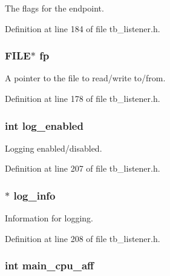 The flags for the endpoint. 



Definition at line 184 of file tb\-\_\-listener.\-h.

\hypertarget{structtb__listener__t_aa065f30aa9f5f9a42132c82c787ee70b}{
\subsubsection[{fp}]{\setlength{\rightskip}{0pt plus 5cm}F\-I\-L\-E$\ast$ fp}}\label{structtb__listener__t_aa065f30aa9f5f9a42132c82c787ee70b}


A pointer to the file to read/write to/from. 



Definition at line 178 of file tb\-\_\-listener.\-h.

\hypertarget{structtb__listener__t_a511e73c6f56fe64b24f9261939aec65f}{
\subsubsection[{log\-\_\-enabled}]{\setlength{\rightskip}{0pt plus 5cm}int log\-\_\-enabled}}\label{structtb__listener__t_a511e73c6f56fe64b24f9261939aec65f}


Logging enabled/disabled. 



Definition at line 207 of file tb\-\_\-listener.\-h.

\hypertarget{structtb__listener__t_a206b8711b0b270577f073bdc99b0917d}{
\subsubsection[{log\-\_\-info}]{$\ast$ log\-\_\-info}}\label{structtb__listener__t_a206b8711b0b270577f073bdc99b0917d}


Information for logging. 



Definition at line 208 of file tb\-\_\-listener.\-h.

\hypertarget{structtb__listener__t_a2715f812fc8239e875c5e9413f8ed04b}{
\subsubsection[{main\-\_\-cpu\-\_\-aff}]{\setlength{\rightskip}{0pt plus 5cm}int main\-\_\-cpu\-\_\-aff}}\label{structtb__listener__t_a2715f812fc8239e875c5e9413f8ed04b}


